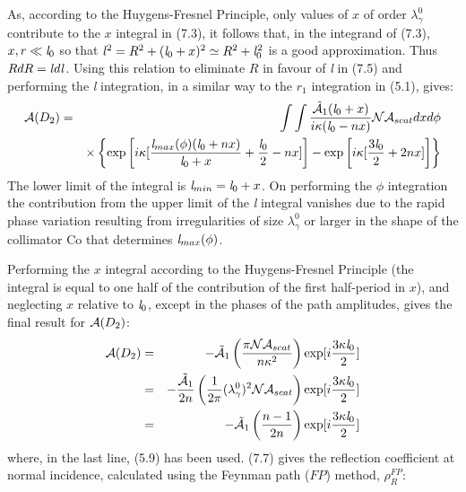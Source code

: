 \documentclass [12pt]{article}
\begin{document}
{   As, according to the Huygens-Fresnel Principle, only values of $x$ of order $\lambda_{\gamma}^0$ 
   contribute to the $x$ integral in (7.3), it follows that, in the integrand of (7.3),
    $x,r \ll {\it l}_0$ so that ${\it l}^2 =  R^2+({\it l}_0+x)^2 \simeq  R^2+{\it l}_0^2$ is a good
    approximation. Thus $RdR = {\it l} d{\it l}$. Using this relation to 
   eliminate $R$ in favour of {\it l} in (7.5) and performing the {\it l} integration,
    in a similar way to the $r_1$ integration in (5.1), gives:
   \begin{eqnarray}
  {\cal A}(D_2) & = & \int \int \frac{ \tilde{ {\cal A}}_1 ({\it l}_0+x)}{i \kappa ({\it l}_0-nx)}{\cal N} {\cal A}_{scat}
       dx d\phi \nonumber \\
      &   & \times \left\{ \exp \left[i \kappa[\frac{{\it l}_{max}(\phi)({\it l}_0+nx)}{{\it l}_0+x}+\frac{{\it l}_0}{2}-nx]\right]
                  -  \exp \left[i \kappa [\frac{3{\it l}_0}{2}+2nx] \right]\right\}   
   \end{eqnarray}
    The lower limit of the integral is ${\it l}_{min} = {\it l}_0+x$. On performing the $\phi$ integration
    the contribution from the upper limit of the {\it l} integral vanishes due to the rapid phase
     variation resulting from irregularities of size $\lambda_{\gamma}^0$ or larger in the shape of the
    collimator Co that determines ${\it l}_{max}(\phi)$.
    \par Performing the $x$ integral according to the Huygens-Fresnel Principle (the integral is equal to
     one half of the contribution of the first half-period in $x$), and neglecting $x$ relative to ${\it l}_0$,
    except in the phases of the path amplitudes, gives the final result for ${\cal A}(D_2)$:
   \begin{eqnarray}
  {\cal A}(D_2) & = & - \tilde{ {\cal A}}_1 \left(\frac{\pi {\cal N} {\cal A}_{scat}}{n \kappa^2}\right)
    \exp[i\frac{3 \kappa {\it l}_0}{2}]  \nonumber \\
         & = & -\frac{\tilde{ {\cal A}}_1}{2n}\left(\frac{1}{2\pi} (\lambda_{\gamma}^0)^2
      {\cal N} {\cal A}_{scat} \right) \exp[i\frac{3 \kappa {\it l}_0}{2}] \nonumber \\
      & = & -\tilde{{\cal A}}_1 \left(\frac{n-1}{2n}\right) \exp[i\frac{3 \kappa {\it l}_0}{2}]       
     \end{eqnarray}
   where, in the last line, (5.9) has been used. (7.7) gives the reflection coefficient at normal
    incidence, calculated using the Feynman path ($FP$) method, $\rho_R^{FP}$:
   \begin{equation}

\end{equation}}
\end{document}
